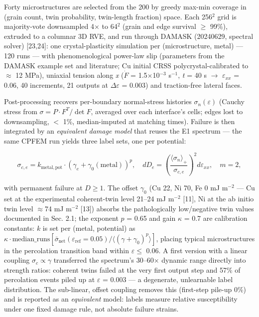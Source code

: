 \documentclass[preprint,12pt]{elsarticle}
\begin{document}
Forty microstructures are selected from the 200 by greedy max-min coverage in (grain count, twin probability, twin-length fraction) space. Each 256$^{2}$ grid is majority-vote downsampled 4$\times$ to 64$^{2}$ (grain and edge survival $\ge$ 99\%), extruded to a columnar 3D RVE, and run through DAMASK (20240629, spectral solver) [23,24]: one crystal-plasticity simulation per (microstructure, metal) --- 120 runs --- with phenomenological power-law slip (parameters from the DAMASK example set and literature; Cu initial CRSS polycrystal-calibrated to $\approx$ 12 MPa), uniaxial tension along \textit{x} ($\dot F$ = 1.5$\times$10$^{-3}$ s$^{-1}$, \textit{t} = 40 s $\rightarrow$ $\varepsilon_{xx}$ = 0.06, 40 increments, 21 outputs at $\Delta\varepsilon$ = 0.003) and traction-free lateral faces.

Post-processing recovers per-boundary normal-stress histories $\sigma_n(\varepsilon)$ (Cauchy stress from $\sigma = P\cdot F^{T}/\det F$, averaged over each interface's cells; edges lost to downsampling, $<$ 1\%, median-imputed at matching times). Failure is then integrated by an \textit{equivalent damage model} that reuses the E1 spectrum --- the same CPFEM run yields three label sets, one per potential:

\[
\sigma_{c,e} = k_{\mathrm{metal,pot}} \cdot \left(\gamma_e + \gamma_0(\mathrm{metal})\right)^{p}, \quad
dD_e = \left(\frac{\langle\sigma_n\rangle_{+}}{\sigma_{c,e}}\right)^{2} d\varepsilon_{xx}, \quad m = 2,
\]

with permanent failure at $D \ge 1$. The offset $\gamma_0$ (Cu 22, Ni 70, Fe 0 mJ m$^{-2}$ --- Cu set at the experimental coherent-twin level 21--24 mJ m$^{-2}$ [11], Ni at the ab initio twin level $\approx$74 mJ m$^{-2}$ [13]) absorbs the pathologically low/negative twin values documented in Sec. 2.1; the exponent $p$ = 0.65 and gain $\kappa$ = 0.7 are calibration constants: $k$ is set per (metal, potential) as $\kappa \cdot \mathrm{median\_runs}[\bar{\sigma}_{\mathrm{net}}(\varepsilon_{\mathrm{ref}} = 0.05) / \langle(\gamma+\gamma_0)^{p}\rangle]$, placing typical microstructures in the percolation transition band within $\varepsilon \le$ 0.06. A first version with a linear coupling $\sigma_{c} \propto \gamma$ transferred the spectrum's 30--60$\times$ dynamic range directly into strength ratios: coherent twins failed at the very first output step and 57\% of percolation events piled up at $\varepsilon$ = 0.003 --- a degenerate, unlearnable label distribution. The sub-linear, offset coupling removes this (first-step pile-up 0\%) and is reported as an \textit{equivalent} model: labels measure relative susceptibility under one fixed damage rule, not absolute failure strains.
\end{document}
